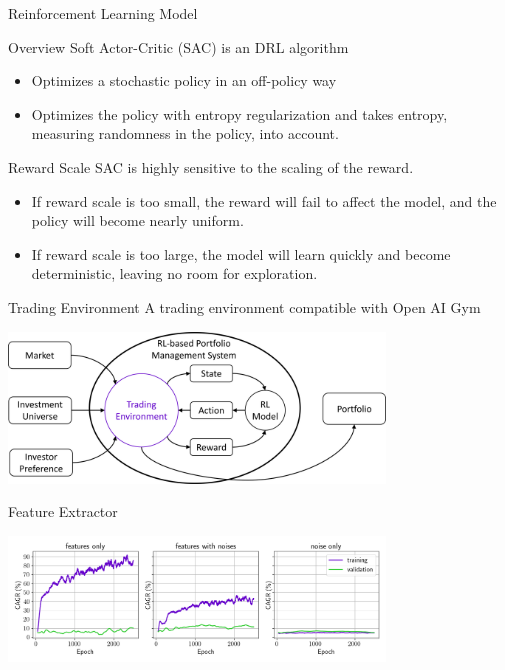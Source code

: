 \begin{frame}{Reinforcement Learning Model}
\begin{block}{Overview}
Soft Actor-Critic (SAC) is an DRL algorithm
\begin{itemize}
    \item Optimizes a stochastic policy in an off-policy way
    \item Optimizes the policy with entropy regularization and takes entropy, measuring randomness in the policy, into account.
\end{itemize}
\end{block}
\begin{block}{Reward Scale}
SAC is highly sensitive to the scaling of the reward. 
\begin{itemize}
    \item If reward scale is too small, the reward will fail to affect the model, and the policy will become nearly uniform.
    \item If reward scale is too large, the model will learn quickly and become deterministic, leaving no room for exploration.
\end{itemize}
\end{block}
\end{frame}



\begin{frame}{Trading Environment}
A trading environment compatible with Open AI Gym
\begin{center}
  \includegraphics[width=10cm]{images/trading_environment.png}
\end{center}
\end{frame}

\begin{frame}{Feature Extractor}
\begin{center}
  \includegraphics[width=10cm]{images/compare_noise.png}
\end{center}
\end{frame}

